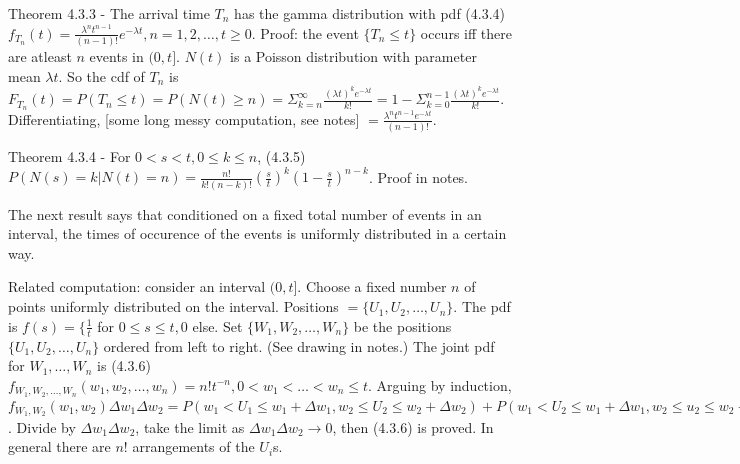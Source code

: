 \documentclass{article}
\begin{document}
Theorem 4.3.3 - The arrival time $T_n$ has the gamma distribution with pdf (4.3.4) $f_{T_n}(t) = \frac{\lambda^n t^{n-1}}{(n-1)!} e^{-\lambda t}, n = 1, 2, \dots, t \ge 0$. Proof: the event $\{T_n \le t\}$ occurs iff there are atleast $n$ events in $(0, t]$. $N(t)$ is a Poisson distribution with parameter mean $\lambda t$. So the cdf of $T_n$ is $F_{T_n}(t) = P(T_n \le t) = P(N(t) \ge n) = \Sigma_{k = n}^\infty \frac{(\lambda t)^k e^{-\lambda t}}{k!} = 1 - \Sigma_{k=0}^{n-1} \frac{(\lambda t)^k e^{-\lambda t}}{k!}$. Differentiating, [some long messy computation, see notes] $= \frac{\lambda^n t^{n-1} e^{-\lambda t}}{(n-1)!}$.

Theorem 4.3.4 - For $0 < s < t, 0 \le k \le n$, (4.3.5) $P(N(s) = k|N(t) = n) = \frac{n!}{k!(n-k)!} (\frac{s}{t})^k (1 - \frac{s}{t})^{n-k}$. Proof in notes.

The next result says that conditioned on a fixed total number of events in an interval, the times of occurence of the events is uniformly distributed in a certain way.

Related computation: consider an interval $(0, t]$. Choose a fixed number $n$ of points uniformly distributed on the interval. Positions $= \{U_1, U_2, \dots, U_n\}$. The pdf is $f(s) = \{\frac{1}{t}$ for $0 \le s \le t, 0$ else. Set $\{W_1, W_2, \dots, W_n\}$ be the positions $\{U_1, U_2, \dots, U_n\}$ ordered from left to right. (See drawing in notes.) The joint pdf for $W_1, \dots, W_n$ is (4.3.6) $f_{W_1, W_2, \dots, W_n}(w_1, w_2, \dots, w_n) = n!t^{-n}, 0 < w_1 < \dots < w_n \le t$. Arguing by induction, $f_{W_1, W_2}(w_1, w_2) \Delta w_1 \Delta w_2 = P(w_1 < U_1 \le w_1 + \Delta w_1, w_2 \le U_2 \le w_2 + \Delta w_2) + P(w_1 < U_2 \le w_1 + \Delta w_1, w_2 \le u_2 \le w_2 + \Delta w_2) = 2(\frac{\Delta w_1}{t}) (\frac{\Delta w_2}{t}) = 2t^{-2} \Delta w_1 \Delta w_2$. Divide by $\Delta w_1 \Delta w_2$, take the limit as $\Delta w_1 \Delta w_2 \rightarrow 0$, then (4.3.6) is proved. In general there are $n!$ arrangements of the $U_i$s.
\end{document}

